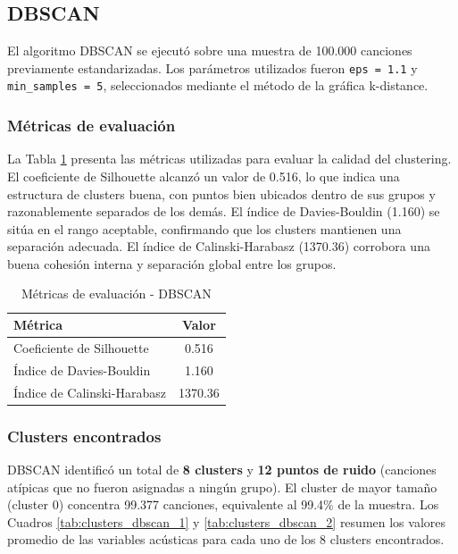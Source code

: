 \subsection{DBSCAN}

El algoritmo DBSCAN se ejecutó sobre una muestra de 100.000 canciones previamente estandarizadas. Los parámetros utilizados fueron \texttt{eps = 1.1} y \texttt{min\_samples = 5}, seleccionados mediante el método de la gráfica k-distance.

\subsubsection{Métricas de evaluación}

La Tabla \ref{tab:metricas_dbscan} presenta las métricas utilizadas para evaluar la calidad del clustering. El coeficiente de Silhouette alcanzó un valor de 0.516, lo que indica una estructura de clusters buena, con puntos bien ubicados dentro de sus grupos y razonablemente separados de los demás. El índice de Davies-Bouldin (1.160) se sitúa en el rango aceptable, confirmando que los clusters mantienen una separación adecuada. El índice de Calinski-Harabasz (1370.36) corrobora una buena cohesión interna y separación global entre los grupos.

\begin{table}[htbp]
\caption{Métricas de evaluación - DBSCAN}
\centering
\small
\begin{tabular}{|l|c|}
\hline
\textbf{Métrica} & \textbf{Valor} \\
\hline
Coeficiente de Silhouette & 0.516 \\
Índice de Davies-Bouldin & 1.160 \\
Índice de Calinski-Harabasz & 1370.36 \\
\hline
\end{tabular}
\label{tab:metricas_dbscan}
\end{table}

\subsubsection{Clusters encontrados}

DBSCAN identificó un total de \textbf{8 clusters} y \textbf{12 puntos de ruido} (canciones atípicas que no fueron asignadas a ningún grupo). El cluster de mayor tamaño (cluster 0) concentra 99.377 canciones, equivalente al 99.4\% de la muestra. Los Cuadros \ref{tab:clusters_dbscan_1} y \ref{tab:clusters_dbscan_2} resumen los valores promedio de las variables acústicas para cada uno de los 8 clusters encontrados.

